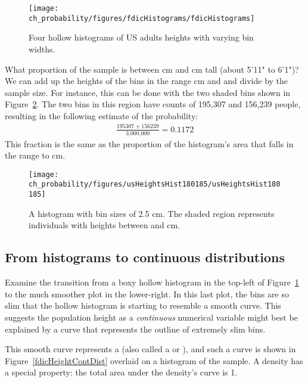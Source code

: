 \begin{figure}[ht]
\centering
\texttt{[image: ch\_probability/figures/fdicHistograms/fdicHistograms]}
\caption{Four hollow histograms of US adults heights with varying bin widths.}
\label{fdicHistograms}
\end{figure}

\begin{example}{What proportion of the sample is between  cm and  cm tall (about 5'11" to 6'1")?}\label{contDistProb}
We can add up the heights of the bins in the range  cm and  and divide by the sample size. For instance, this can be done with the two shaded bins shown in Figure~\ref{usHeightsHist180185}. The two bins in this region have counts of 195,307 and 156,239 people, resulting in the following estimate of the probability:
\begin{eqnarray*}
\frac{195307+156239}{\text{3,000,000}} = 0.1172
\end{eqnarray*}
This fraction is the same as the proportion of the histogram's area that falls in the range  to  cm.
\end{example}

\begin{figure}
\centering
\texttt{[image: ch\_probability/figures/usHeightsHist180185/usHeightsHist180185]}
\caption{A histogram with bin sizes of 2.5 cm. The shaded region represents individuals with heights between  and  cm. }
\label{usHeightsHist180185}
\end{figure}

\subsection{From histograms to continuous distributions}

Examine the transition from a boxy hollow histogram in the top-left of Figure~\ref{fdicHistograms} to the much smoother plot in the lower-right. In this last plot, the bins are so slim that the hollow histogram is starting to resemble a smooth curve. This suggests the population height as a \emph{continuous} numerical variable might best be explained by a curve that represents the outline of extremely slim bins.

This smooth curve represents a  (also called a  or ), and such a curve is shown in Figure~\ref{fdicHeightContDist} overlaid on a histogram of the sample. A density has a special property: the total area under the density's curve is 1. 

